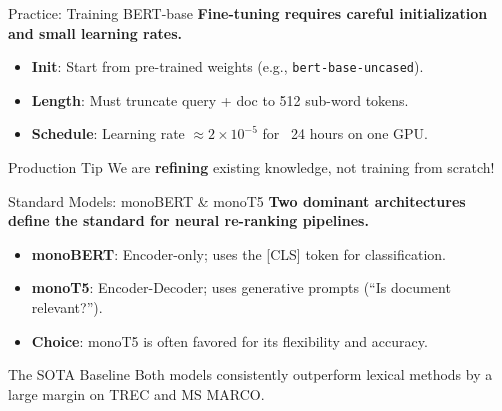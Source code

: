 \documentclass[aspectratio=169]{beamer}
\newif\ifanimated
\newcommand{\cpause}{\ifanimated\pause\fi}
\begin{document}
\begin{frame}{Practice: Training BERT-base}
\textbf{Fine-tuning requires careful initialization and small learning rates.}

\vspace{0.8em}
\begin{itemize}
    \item \textbf{Init}: Start from pre-trained weights (e.g., \texttt{bert-base-uncased}).
    \item \textbf{Length}: Must truncate query + doc to 512 sub-word tokens.
    \item \textbf{Schedule}: Learning rate $\approx 2 \times 10^{-5}$ for ~24 hours on one GPU.
\end{itemize}

\vspace{1em}
\cpause
\begin{alertblock}{Production Tip}
We are \textbf{refining} existing knowledge, not training from scratch!
\end{alertblock}
\end{frame}

\begin{frame}{Standard Models: monoBERT \& monoT5}
\textbf{Two dominant architectures define the standard for neural re-ranking pipelines.}

\vspace{0.8em}
\begin{itemize}
    \item \textbf{monoBERT}: Encoder-only; uses the [CLS] token for classification.
    \item \textbf{monoT5}: Encoder-Decoder; uses generative prompts (``Is document relevant?'').
    \item \textbf{Choice}: monoT5 is often favored for its flexibility and accuracy.
\end{itemize}

\vspace{1em}
\cpause
\begin{exampleblock}{The SOTA Baseline}
Both models consistently outperform lexical methods by a large margin on TREC and MS MARCO.
\end{exampleblock}
\end{frame}
\end{document}
